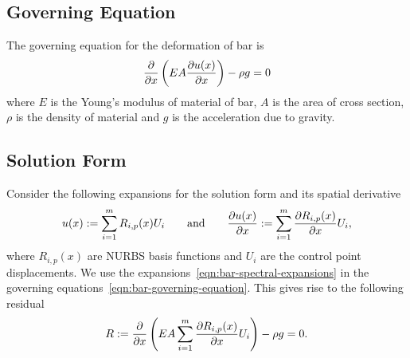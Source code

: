 \documentclass[submit,12pt]{aiaa-pretty} %
\begin{document}
\subsection{Governing Equation}
The governing equation for the deformation of bar is
\begin{equation}\label{eqn:bar-governing-equation}
  \dfrac{\partial }{\partial x} \left( EA \dfrac{\partial u(x)}{\partial x} \right) - \rho g  = 0
\end{equation}
where $E$ is the Young's modulus of material of bar, $A$ is the area
of cross section, $\rho$ is the density of material and $g$ is the
acceleration due to gravity.
\subsection{Solution Form}
Consider the following expansions for the
solution form and its spatial derivative
\begin{equation}\label{eqn:bar-spectral-expansions}
  u(x) := \sum_{i=1}^{m} R_{i,p}(x) U_i \qquad \mathrm{and} \qquad \dfrac{\partial u(x)}{\partial x} := \sum_{i=1}^{m} \dfrac{\partial R_{i,p}(x)}{\partial x}  U_i,
\end{equation}
where $R_{i,p}(x)$ are NURBS basis functions and $U_i$ are the control
point displacements. We use the expansions~\eqref{eqn:bar-spectral-expansions} in
the governing equations~\eqref{eqn:bar-governing-equation}. This gives
rise to the following residual
\begin{equation}\label{eqn:bar-governing-equation}
  R := \dfrac{\partial }{\partial x} \left( EA  \sum_{i=1}^{m} \dfrac{\partial R_{i,p}(x)}{\partial x}  U_i \right) - \rho g  = 0.
\end{equation}
\end{document}
